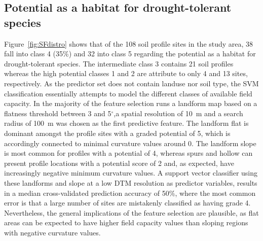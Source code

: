\documentclass[preprint,12pt,authoryear]{elsarticle}
\begin{document}
\subsection{Potential as a habitat for drought-tolerant species}
Figure~\ref{fig:SFdistro} shows that of the 108 soil profile sites in the study area, 38 fall into class 4 (35\%) and 32 into class 5 regarding the potential as a habitat for drought-tolerant species. The intermediate class 3 contains 21 soil profiles whereas the high potential classes 1 and 2 are attribute to only 4 and 13 sites, respectively. 
As the predictor set does not contain landuse nor soil type, the SVM classification essentially attempts to model the different classes of available field capacity. In the majority of the feature selection runs a landform map based on a flatness threshold between 3 and 5$^{\circ}$,a spatial resolution of 10~m and a search radius of 100~m was chosen as the first predictive feature. The landform flat is dominant amongst the profile sites with a graded potential of 5, which is accordingly connected to minimal curvature values around 0. The landform slope is  most common for profiles with a potential  of 4, whereas spurs and hollow can present profile locations with a  potential score of 2 and, as expected, have increasingly negative minimum curvature values. A support vector classifier using these landforms and slope at a low DTM resolution as predictor variables, results in a median cross-validated prediction accuracy of 50\%, where the most common error is that  a large number of sites are mistakenly classified as having grade 4. Nevertheless, the general implications of the feature selection are plausible, as flat areas  can  be expected to have higher field capacity values than sloping regions with negative curvature values.
\end{document}
